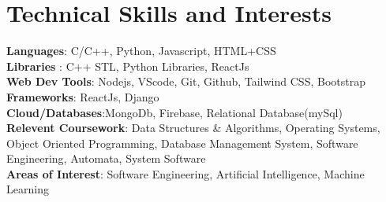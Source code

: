\documentclass[a4paper,11pt]{article}
\begin{document}
\section{\textbf{Technical Skills and Interests}}
 \begin{itemize}[leftmargin=0.05in, label={}]
    \small{\item{
     \vspace{1.0mm}
     \textbf{Languages}{: C/C++, Python, Javascript, HTML+CSS } \\
     \vspace{0.4mm}
     \textbf{Libraries }{: C++ STL, Python Libraries, ReactJs }\\ 
     \vspace{0.4mm}
     \textbf{Web Dev Tools}{: Nodejs, VScode, Git, Github, Tailwind CSS, Bootstrap } \\ 
     \vspace{0.4mm}
     \textbf{Frameworks}{: ReactJs, Django } \\
     \vspace{0.4mm}
     \textbf{Cloud/Databases}{:MongoDb, Firebase, Relational Database(mySql) } \\  
     \vspace{0.4mm}
     \textbf{Relevent Coursework}{: Data Structures \& Algorithms, Operating Systems, Object Oriented Programming, Database Management System, Software Engineering, Automata, System Software } \\ 
     \vspace{0.4mm}
     \textbf{Areas of Interest}{: Software Engineering, Artificial Intelligence, Machine Learning} \\
    }}
 \end{itemize}
 \vspace{-3.6mm}


\end{document}
